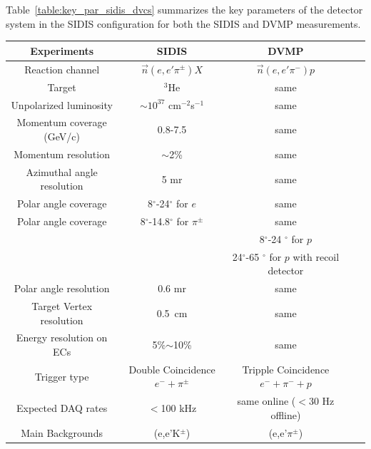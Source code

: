 Table~\ref{table:key_par_sidis_dvcs} summarizes the key parameters of the detector system in the SIDIS configuration for both the SIDIS and DVMP measurements. 
\begin{table}\centering
\begin{tabular}{|c|c|c|c|c|}
\hline
Experiments                             & SIDIS                 & DVMP  \\\hline
Reaction channel                     &  $\vec{n}(e,e'\pi^{\pm})X$    & $\vec{n}(e,e'\pi^{-})p$	\\\hline
Target                                       & $^3$He                &same 	\\\hline
Unpolarized luminosity             & $\sim10^{37}$ cm$^{-2}$s$^{-1}$        & same	\\\hline 
Momentum coverage (GeV/c)  & 0.8-7.5               &same 	\\\hline
Momentum resolution              &  $\sim$2\%            & same\\\hline
Azimuthal angle resolution      & 5 mr                  & same	\\\hline
Polar angle coverage              &  8$^{\circ}$-24$^{\circ}$ for $e$                 &  same \\\hline
Polar angle coverage              &  8$^{\circ}$-14.8$^{\circ}$ for $\pi^{\pm}$  &  same 	\\\hline
				                                 &                                                        & 8$^{\circ}$-24 $^{\circ}$ for $p$         \\\hline
   				                                 &                                                        & 24$^{\circ}$-65 $^{\circ}$ for $p$ with recoil detector         \\\hline
 Polar angle resolution             & 0.6 mr                & same	\\\hline
Target Vertex resolution          & 0.5~cm                & same \\\hline
 Energy resolution on ECs      & 5\%$\sim$10\%         & same   \\\hline
Trigger type                             & Double Coincidence $e^-+\pi^{\pm}$ & Tripple Coincidence $e^-+\pi^{-}+p$\\\hline
Expected DAQ rates               &  $<$100 kHz           &  same online ($<$30 Hz offline)\\\hline
Main Backgrounds                  & (e,e'K$^\pm$)        &(e,e'$\pi^{\pm}$) \\

\end{tabular}
\end{table}
